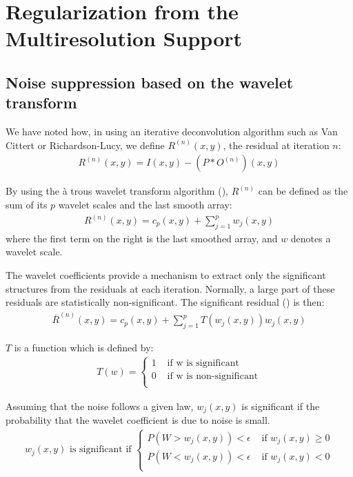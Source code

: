 \section{Regularization from the Multiresolution Support}
\subsection{Noise suppression based on the wavelet transform}
We have noted how, in using 
an iterative deconvolution algorithm such as  Van Cittert or
Richardson-Lucy, we define $R^{(n)}(x,y)$, the residual at iteration $n$:
\begin{eqnarray}
R^{(n)}(x,y) = I(x,y) - (P * O^{(n)})(x,y)
\end{eqnarray}
 
 By using the \`a trous wavelet transform algorithm 
(\cite{starck:bij94_1,starck:phd,starck:midas}), $R^{(n)}$ 
can be defined as the sum of its $p$ wavelet scales and the last smooth 
array:
\begin{eqnarray}
R^{(n)}(x,y) = c_{p}(x,y) + \sum_{j=1}^{p} w_j(x,y) 
\end{eqnarray}
where the first term on the right is the last smoothed array, 
and $w$ denotes a wavelet scale.
 
The wavelet coefficients provide a mechanism to extract only the significant 
structures from the residuals 
at each iteration. Normally, a large part of
these residuals are statistically non-significant. 
The significant residual (\cite{starck:mur94_1,starck:sta94_1}) is then:
\begin{eqnarray}
\bar{R}^{(n)}(x,y) = c_{p}(x,y) + \sum_{j=1}^{p} T(w_j(x,y)) w_j(x,y)
\label{eq_resi}
\end{eqnarray}
 
\noindent $T$ is a function which is defined by:
\begin{eqnarray}
T(w) = \left\{
  \begin{array}{ll}
  1 & \mbox{ if w is significant} \\
  0 & \mbox{ if w is non-significant} \\
  \end{array}
  \right.
\end{eqnarray}
 
Assuming that the noise follows a given law,  
 $w_j(x,y)$ is significant if the probability that the wavelet coefficient
is due to noise is small. 
\begin{eqnarray}
w_j(x,y) \mbox{ is significant if } \left\{ \begin{array}{ll}
  P(W > w_j(x,y)) < \epsilon & \mbox{ if }   w_j(x,y) \geq 0 \\
  P(W < w_j(x,y)) < \epsilon & \mbox{ if }   w_j(x,y) < 0 \\
  \end{array}
  \right.
\end{eqnarray}

